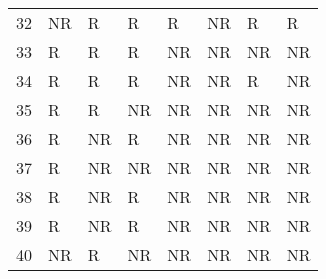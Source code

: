 \begin{tabular}{rlllllll}
32 & NR & R & R & R & NR & R & R \\
33 & R & R & R & NR & NR & NR & NR \\
34 & R & R & R & NR & NR & R & NR \\
35 & R & R & NR & NR & NR & NR & NR \\
36 & R & NR & R & NR & NR & NR & NR \\
37 & R & NR & NR & NR & NR & NR & NR \\
38 & R & NR & R & NR & NR & NR & NR \\
39 & R & NR & R & NR & NR & NR & NR \\
40 & NR & R & NR & NR & NR & NR & NR \\
\bottomrule
\end{tabular}
